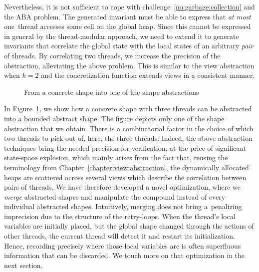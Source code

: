 %
Nevertheless, it is not sufficient to cope with
challenge~\ref{no:garbage:collection} and the ABA problem.
%
The generated invariant must be able to express that \emph{at most}
one~thread accesses some cell on the global heap.
%
Since this cannot be expressed in general by the thread-modular
approach, we need to extend it %
to generate invariants %
that correlate the global state with the local states of an arbitrary
\emph{pair} of threads.
%
%
%
By correlating two threads, we increase the precision of the
abstraction, alleviating the above problem. This is similar to the
view abstraction when $k=2$ and the concretization function extends
views in a consistent manner.

\begingroup%
\setlength\intextsep{\dazintextsep}
\begin{figure}[ht]
  \caption{From a concrete shape into one of the shape abstractions}
  \label{figure:shape:abstraction}
\end{figure}
\endgroup

In Figure~\ref{figure:shape:abstraction}, we show how a concrete shape
with three threads can be abstracted into a bounded abstract
shape. The figure depicts only one of the shape abstraction that we
obtain. There is a combinatorial factor in the choice of which two
threads to pick out of, here, the three threads.
%
Indeed, the above abstraction techniques bring the needed precision
for verification, at the price of significant state-space explosion,
which mainly arises from the fact that, reusing the terminology from
Chapter~\ref{chapter:view:abstraction}, the dynamically allocated
heaps are scattered across several views which describe the
correlation between pairs of threads.
%
We have therefore developed a novel optimization, where we
\emph{merge} abstracted shapes and manipulate the compound instead of
every individual abstracted shapes.
%
%
Intuitively, merging does not bring a~penalizing %
imprecision due to the structure of the retry-loops.
%
%
When the thread's local variables are initially placed, but the global
shape changed through the actions of other threads, the current thread
will detect it and restart its initialization.
%
Hence, recording precisely where those local variables are is often
superfluous information that can be discarded.
%
We touch more on that optimization in the next section.
